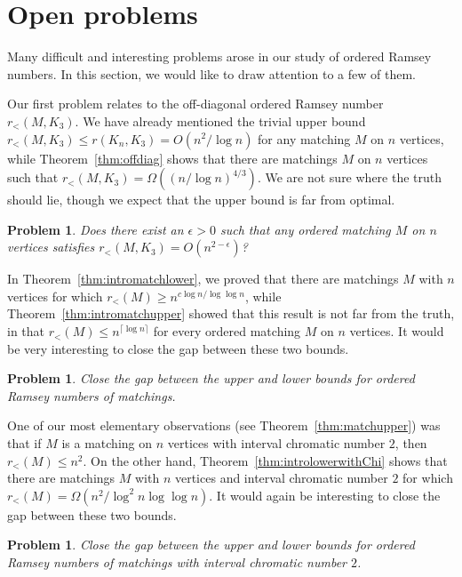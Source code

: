 \documentclass[11pt]{article}
\newtheorem{problem}[theorem]{Problem}
\begin{document}
\section{Open problems} \label{sec:conclusion2}

Many difficult and interesting problems arose in our study of ordered Ramsey numbers. In this section, we would like to draw attention to a few of them.

Our first problem relates to the off-diagonal ordered Ramsey number $r_<(M,K_3)$. We have already mentioned the trivial upper bound $r_<(M, K_3) \leq r(K_n, K_3) = O(n^2/\log n)$ for any matching $M$ on $n$ vertices, while Theorem~\ref{thm:offdiag} shows that there are matchings $M$ on $n$ vertices such that $r_<(M, K_3) = \Omega((n/\log n)^{4/3})$. We are not sure where the truth should lie, though we expect that the upper bound is far from optimal.

\begin{problem} 
Does there exist an $\epsilon > 0$ such that any ordered matching $M$ on $n$ vertices satisfies $r_<(M,K_3) = O(n^{2 - \epsilon})$?
\end{problem}

In Theorem~\ref{thm:intromatchlower}, we proved that there are matchings $M$ with $n$ vertices for which $r_<(M) \geq n^{c \log n/\log \log n}$, while Theorem~\ref{thm:intromatchupper} showed that this result is not far from the truth, in that $r_<(M) \leq n^{\lceil \log n \rceil}$ for every ordered matching $M$ on $n$ vertices. It would be very interesting to close the gap between these two bounds.

\begin{problem}
Close the gap between the upper and lower bounds for ordered Ramsey numbers of matchings.
\end{problem}

One of our most elementary observations (see Theorem~\ref{thm:matchupper}) was that if $M$ is a matching on $n$ vertices with interval chromatic number $2$, then $r_<(M) \leq n^2$. On the other hand, Theorem~\ref{thm:introlowerwithChi} shows that there are matchings $M$ with $n$ vertices and interval chromatic number $2$ for which $r_<(M) = \Omega(n^2/\log^2 n \log \log n)$. It would again be interesting to close the gap between these two bounds.

\begin{problem}
Close the gap between the upper and lower bounds for ordered Ramsey numbers of matchings with interval chromatic number $2$.
\end{problem}
\end{document}
